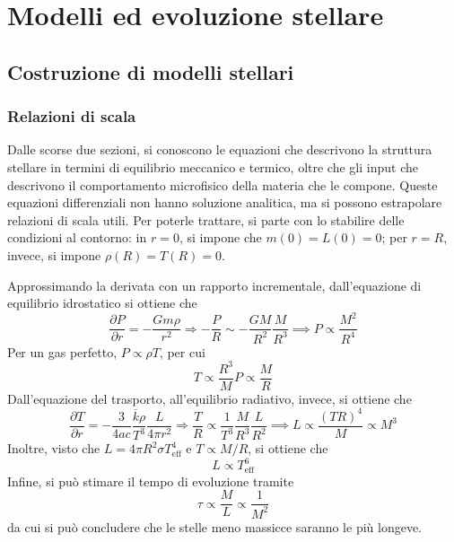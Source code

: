 \documentclass[11pt, a4paper]{scrartcl}
\theoremstyle{style}
\theoremstyle{style1}
\numberwithin{equation}{subsection}
\begin{document}
\section{Modelli ed evoluzione stellare}

\subsection{Costruzione di modelli stellari}
\subsubsection{Relazioni di scala}
Dalle scorse due sezioni, si conoscono le equazioni che descrivono la struttura stellare in termini di equilibrio meccanico e termico, oltre che gli input che descrivono il comportamento microfisico della materia che le compone.
Queste equazioni differenziali non hanno soluzione analitica, ma si possono estrapolare relazioni di scala utili.
Per poterle trattare, si parte con lo stabilire delle condizioni al contorno: in $r=0$, si impone che $m(0) = L(0) = 0$; per $r=R$, invece, si impone $\rho (R)= T(R) = 0$.

Approssimando la derivata con un rapporto incrementale, dall'equazione di equilibrio idrostatico si ottiene che
\[
\frac{\partial P}{\partial r}  = - \frac{Gm \rho }{r^2} \Rightarrow  - \frac{P}{R} \sim - \frac{GM}{R^2} \frac{M}{R^3} \implies P \propto \frac{M^2}{R^4}
\] 
Per un gas perfetto, $P \propto \rho  T$, per cui
\[
T \propto \frac{R^3}{M} P \propto \frac{M}{R}
\] 
Dall'equazione del trasporto, all'equilibrio radiativo, invece, si ottiene che
\[
\frac{\partial T}{\partial r}  = - \frac{3}{4a c} \frac{\overline{k} \rho }{T^3} \frac{L}{4 \pi r^2} \Rightarrow \frac{T}{R} \propto \frac{1}{T^3} \frac{M}{R^3} \frac{L}{R^2} \implies L \propto \frac{(TR)^4}{M} \propto M^3
\] 
Inoltre, visto che $L = 4 \pi R^2 \sigma T_\text{eff}^4$ e $T \propto M / R$, si ottiene che 
\[
L \propto T_\text{eff}^6
\] 
Infine, si pu\`o stimare il tempo di evoluzione tramite
\[
\tau  \propto \frac{M}{L} \propto \frac{1}{M^2}
\] 
da cui si pu\`o concludere che le stelle meno massicce saranno le pi\`u longeve.
\end{document}
